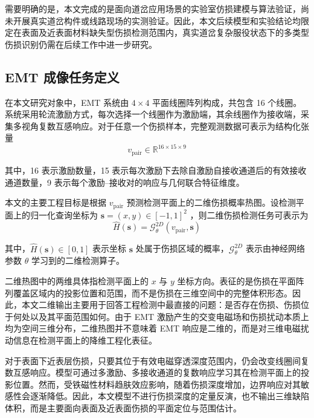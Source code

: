 需要明确的是，本文完成的是面向道岔应用场景的实验室仿损建模与算法验证，尚未开展真实道岔构件或线路现场的实测验证。因此，本文后续模型和实验结论均限定在表面及近表面材料缺失型伤损检测范围内，真实道岔复杂服役状态下的多类型伤损识别仍需在后续工作中进一步研究。

\subsection{EMT 成像任务定义}
\label{subsec:emt_task_definition}

在本文研究对象中，EMT 系统由 $4\times4$ 平面线圈阵列构成，共包含 16 个线圈。系统采用轮流激励方式，每次选择一个线圈作为激励端，其余线圈作为接收端，采集多视角复数互感响应。对于任意一个伤损样本，完整观测数据可表示为结构化张量
\begin{equation}
\label{eq:v_pair_shape_task}
v_{\mathrm{pair}}\in\mathbb{R}^{16\times15\times9}
\end{equation}

其中，16 表示激励数量，15 表示每次激励下去除自激励自接收通道后的有效接收通道数量，9 表示每个激励--接收对的响应与几何联合特征维度。

本文的主要工程目标是根据 $v_{\mathrm{pair}}$ 预测检测平面上的二维伤损概率热图。设检测平面上的归一化查询坐标为
$
\mathbf s=(x,y)\in[-1,1]^2
$
，则二维伤损检测任务可表示为
\begin{equation}
\label{eq:heatmap_task}
\hat H(\mathbf s)
=
\mathcal{G}_{\theta}^{2D}
\left(
v_{\mathrm{pair}},\mathbf s
\right)
\end{equation}

其中，$\hat H(\mathbf s)\in[0,1]$ 表示坐标 $\mathbf s$ 处属于伤损区域的概率，$\mathcal{G}_{\theta}^{2D}$ 表示由神经网络参数 $\theta$ 学习到的二维检测算子。

二维热图中的两维具体指检测平面上的 $x$ 与 $y$ 坐标方向。表征的是伤损在平面阵列覆盖区域内的投影位置和范围，而不是伤损在三维空间中的完整体积形态。因此，本文二维输出主要用于回答工程检测中最直接的问题：是否存在伤损、伤损位于何处以及其平面范围如何。由于 EMT 激励产生的交变电磁场和伤损扰动本质上均为空间三维分布，二维热图并不意味着 EMT 响应是二维的，而是对三维电磁扰动信息在检测平面上的降维工程化表征。

对于表面下近表层伤损，只要其位于有效电磁穿透深度范围内，仍会改变线圈间复数互感响应。模型可通过多激励、多接收通道的复数响应学习其在检测平面上的投影位置。然而，受铁磁性材料趋肤效应影响，随着伤损深度增加，边界响应对其敏感性会逐渐降低。因此，本文模型不进行伤损深度的定量反演，也不输出三维缺陷体积，而是主要面向表面及近表面伤损的平面定位与范围估计。

